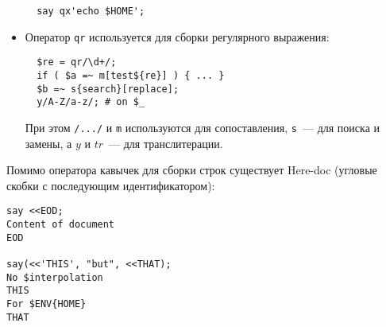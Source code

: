 \begin{itemize}
\begin{verbatim}
  say qx'echo $HOME';
  \end{verbatim}

  \item Оператор \verb|qr| используется для сборки регулярного выражения:
  \begin{verbatim}
  $re = qr/\d+/;
  if ( $a =~ m[test${re}] ) { ... }
  $b =~ s{search}[replace];
  y/A-Z/a-z/; # on $_
  \end{verbatim}
  При этом \verb|/.../| и \verb|m| используются для сопоставления, \verb|s|~--- для поиска и замены, а $y$ и $tr$~--- для транслитерации.
\end{itemize}

Помимо оператора кавычек для сборки строк существует {Here-doc} (угловые скобки с последующим идентификатором):
\begin{verbatim}
say <<EOD;
Content of document
EOD

say(<<'THIS', "but", <<THAT);
No $interpolation
THIS
For $ENV{HOME}
THAT
\end{verbatim}
